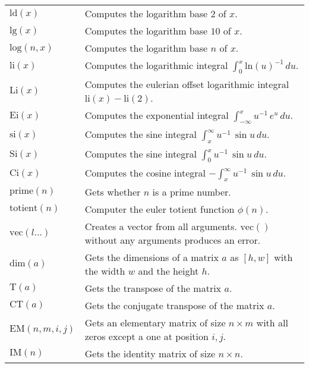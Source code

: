 \documentclass[10pt]{article}
\newcommand{\tabgap}{\vspace{3mm}\\}
\begin{document}
\begin{longtable}{p{}p{}}
        $ \mathrm{ld}(x) $                         & Computes the logarithm base $ 2 $ of $ x $. \\
        $ \mathrm{lg}(x) $                         & Computes the logarithm base $ 10 $ of $ x $. \\
        $ \mathrm{log}(n, x) $                     & Computes the logarithm base $ n $ of $ x $. \tabgap
        $ \mathrm{li}(x) $                         & Computes the logarithmic integral $ \int_0^x \mathrm{ln}(u)^{-1}\,du $. \\
        $ \mathrm{Li}(x) $                         & Computes the eulerian offset logarithmic integral $ \mathrm{li}(x) - \mathrm{li}(2) $. \\
        $ \mathrm{Ei}(x) $                         & Computes the exponential integral $ \int_{-\infty}^x u^{-1}\,e^u\,du $. \\
        $ \mathrm{si}(x) $                         & Computes the sine integral $ \int_x^{\infty} u^{-1}\,\sin u\,du $. \\
        $ \mathrm{Si}(x) $                         & Computes the sine integral $ \int_0^x u^{-1}\,\sin u\,du $. \\
        $ \mathrm{Ci}(x) $                         & Computes the cosine integral $ -\int_x^{\infty} u^{-1}\,\sin u\,du $. \\
        $ \mathrm{prime}(n) $                      & Gets whether $ n $ is a prime number. \\
        $ \mathrm{totient}(n) $                    & Computer the euler totient function $ \phi(n) $. \tabgap
        $ \mathrm{vec}(l\dots) $                   & Creates a vector from all arguments. $ \mathrm{vec}() $ without any arguments produces an error. \\
        $ \mathrm{dim}(a) $                        & Gets the dimensions of a matrix $ a $ as $ [ h, w ] $ with the width $ w $ and the height $ h $. \\
        $ \mathrm{T}(a) $                          & Gets the transpose of the matrix $ a $. \\
        $ \mathrm{CT}(a) $                         & Gets the conjugate transpose of the matrix $ a $. \\
        $ \mathrm{EM}(n,m,i,j) $                   & Gets an elementary matrix of size $ n \times m $ with all zeros except a one at position $ i, j $. \\
        $ \mathrm{IM}(n) $                         & Gets the identity matrix of size $ n \times n $. \\

\end{longtable}
\end{document}
